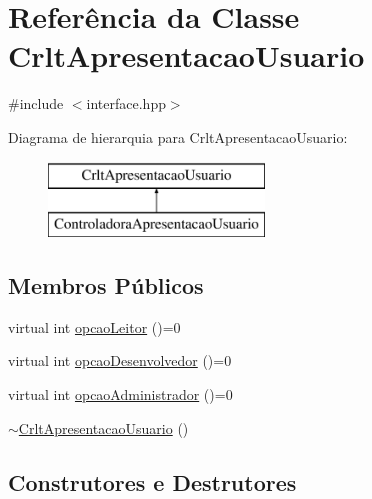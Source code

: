 \hypertarget{class_crlt_apresentacao_usuario}{}\section{Referência da Classe Crlt\+Apresentacao\+Usuario}
\label{class_crlt_apresentacao_usuario}


{\ttfamily \#include $<$interface.\+hpp$>$}

Diagrama de hierarquia para Crlt\+Apresentacao\+Usuario\+:\begin{figure}[H]
\begin{center}
\leavevmode
\includegraphics[height=2.000000cm]{class_crlt_apresentacao_usuario}
\end{center}
\end{figure}
\subsection*{Membros Públicos}
\begin{DoxyCompactItemize}
\item 
virtual int \mbox{\hyperlink{class_crlt_apresentacao_usuario_a627dcf5329233dee6ef2888dacf8a5a1}{opcao\+Leitor}} ()=0
\item 
virtual int \mbox{\hyperlink{class_crlt_apresentacao_usuario_ad9091cb4093bdc687c0deffb5b00512c}{opcao\+Desenvolvedor}} ()=0
\item 
virtual int \mbox{\hyperlink{class_crlt_apresentacao_usuario_aa4e0600a397ea82224441793424d7daa}{opcao\+Administrador}} ()=0
\item 
\mbox{\hyperlink{class_crlt_apresentacao_usuario_a27e014ae8177823f6e9575b7d0b64717}{$\sim$\+Crlt\+Apresentacao\+Usuario}} ()
\end{DoxyCompactItemize}


\subsection{Construtores e Destrutores}
\mbox{\label{class_crlt_apresentacao_usuario_a27e014ae8177823f6e9575b7d0b64717}} 

